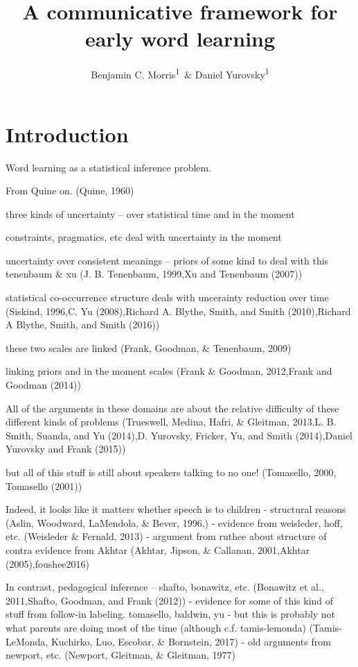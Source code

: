 \documentclass[english,floatsintext,man]{apa6}
\title{A communicative framework for early word learning}
\author{Benjamin C. Morris\textsuperscript{1}~\& Daniel Yurovsky\textsuperscript{1}}
\affiliation{
    \vspace{0.5cm}
          \textsuperscript{1} University of Chicago  }
\theoremstyle{definition}
\theoremstyle{definition}
\theoremstyle{definition}
\theoremstyle{remark}
\begin{document}
\maketitle

\setcounter{secnumdepth}{0}



\section{Introduction}\label{introduction}

Word learning as a statistical inference problem.

From Quine on. (Quine, 1960)

three kinds of uncertainty -- over statistical time and in the moment

constraints, pragmatics, etc deal with uncertainty in the moment

uncertainty over consistent meanings -- priors of some kind to deal with
this tenenbaum \& xu (J. B. Tenenbaum, 1999,Xu and Tenenbaum (2007))

statistical co-occurrence structure deals with uncerainty reduction over
time (Siskind, 1996,C. Yu (2008),Richard A. Blythe, Smith, and Smith
(2010),Richard A Blythe, Smith, and Smith (2016))

these two scales are linked (Frank, Goodman, \& Tenenbaum, 2009)

linking priors and in the moment scales (Frank \& Goodman, 2012,Frank
and Goodman (2014))

All of the arguments in these domains are about the relative difficulty
of these different kinds of problems (Trueswell, Medina, Hafri, \&
Gleitman, 2013,L. B. Smith, Suanda, and Yu (2014),D. Yurovsky, Fricker,
Yu, and Smith (2014),Daniel Yurovsky and Frank (2015))

but all of this stuff is still about speakers talking to no one!
(Tomasello, 2000, Tomasello (2001))

Indeed, it looks like it matters whether speech is to children -
structural reasons (Aslin, Woodward, LaMendola, \& Bever, 1996,) -
evidence from weisleder, hoff, etc. (Weisleder \& Fernald, 2013) -
argument from ruthee about structure of contra evidence from Akhtar
(Akhtar, Jipson, \& Callanan, 2001,Akhtar (2005),foushee2016)

In contrast, pedagogical inference -- shafto, bonawitz, etc. (Bonawitz
et al., 2011,Shafto, Goodman, and Frank (2012)) - evidence for some of
this kind of stuff from follow-in labeling. tomasello, baldwin, yu - but
this is probably not what parents are doing most of the time (although
c.f. tamis-lemonda) (Tamis-LeMonda, Kuchirko, Luo, Escobar, \&
Bornstein, 2017) - old arguments from newport, etc. (Newport, Gleitman,
\& Gleitman, 1977)
\end{document}
